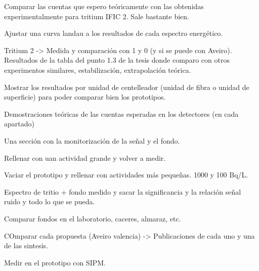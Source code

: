 Comparar las cuentas que espero teóricamente con las obtenidas experimentalmente para tritium IFIC 2. Sale bastante bien.

Ajustar una curva landau a los resultados de cada espectro energético.


Tritium 2 -> Medida y comparación con 1 y 0 (y si se puede con Aveiro). Resultados de la tabla del punto 1.3 de la tesis donde comparo con otros experimentos similares, estabilización, extrapolación teórica.

Mostrar los resultados por unidad de centelleador (unidad de fibra o unidad de superficie) para poder comparar bien los prototipos.

Demostraciones teóricas de las cuentas esperadas en los detectores (en cada apartado)

Una sección con la monitorización de la señal y el fondo.

Rellenar con uan actividad grande y volver a medir. 

Vaciar el prototipo y rellenar con actividades más pequeñas. 1000 y 100 Bq/L.

Espectro de tritio + fondo medido y sacar la significancia y la relación señal ruido y todo lo que se pueda.

Comparar fondos en el laboratorio, caceres, almaraz, etc.

COmparar cada propuesta (Aveiro valencia) -> Publicaciones de cada uno y una de las sintesis.

Medir en el prototipo con SIPM.
